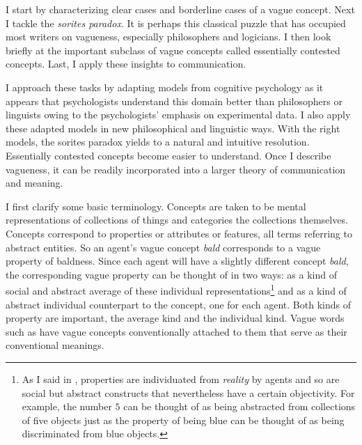 %





I start by characterizing clear cases and borderline cases of a vague concept. Next I tackle the \emph{sorites paradox}. It is perhaps this classical puzzle that has occupied most writers on vagueness, especially philosophers and logicians. I then look briefly at the important subclass of vague concepts called essentially contested concepts. Last, I apply these insights to communication.

I approach these tasks by adapting models from cognitive psychology as it appears that psychologists understand this domain better than philosophers or linguists owing to the psychologists' emphasis on experimental data. I also apply these adapted models in new philosophical and linguistic ways. With the right models, the sorites paradox yields to a natural and intuitive resolution. Essentially contested concepts become easier to understand. Once I describe vagueness, it can be readily incorporated into a larger theory of communication and meaning.\largerpage

I first clarify some basic terminology. Concepts are taken to be mental representations of collections of things and categories the collections themselves. Concepts correspond to properties or attributes or features, all terms referring to abstract entities. So an agent's vague concept \textit{bald} corresponds to a vague property of baldness. Since each agent will have a slightly different concept \emph{bald}, the corresponding vague property can be thought of in two ways: as a kind of social and abstract average of these individual representations{\footnote{As I said in , properties are individuated from \emph{reality} by agents and so are social but abstract constructs that nevertheless have a certain objectivity. For example, the number $5$ can be thought of as being abstracted from collections of five objects just as the property of being blue can be thought of as being discriminated from blue objects.}} and as a kind of abstract individual counterpart to the concept, one for each agent. Both kinds of property are important, the average kind and the individual kind. Vague words such as  have vague concepts conventionally attached to them that serve as their conventional meanings.

